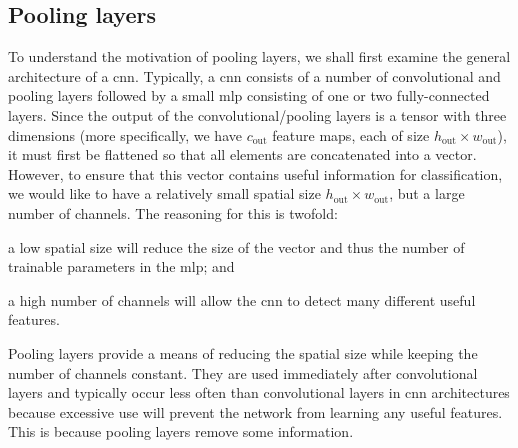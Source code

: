 \documentclass[../report.tex]{subfiles}
\begin{document}
\subsection{Pooling layers}
To understand the motivation of pooling layers, we shall first examine the general architecture of a \gls{cnn}.
Typically, a \gls{cnn} consists of a number of convolutional and pooling layers followed by a small \gls{mlp} consisting of one or two fully-connected layers.
Since the output of the convolutional/pooling layers is a tensor with three dimensions (more specifically, we have $c_\text{out}$ feature maps, each of size $h_\text{out} \times w_\text{out}$), it must first be flattened so that all elements are concatenated into a vector.
However, to ensure that this vector contains useful information for classification, we would like to have a relatively small spatial size $h_\text{out} \times w_\text{out}$, but a large number of channels. 
The reasoning for this is twofold:
\begin{enumerate*}[label=(\roman*)]
    \item a low spatial size will reduce the size of the vector and thus the number of trainable parameters in the \gls{mlp}; and
    \item a high number of channels will allow the \gls{cnn} to detect many different useful features. 
\end{enumerate*}
Pooling layers provide a means of reducing the spatial size while keeping the number of channels constant.
They are used immediately after convolutional layers and typically occur less often than convolutional layers in \gls{cnn} architectures because excessive use will prevent the network from learning any useful features.
This is because pooling layers remove some information.
\end{document}
